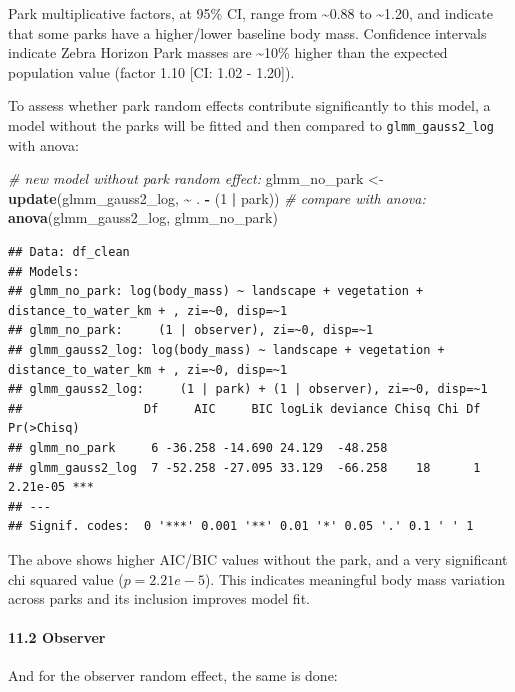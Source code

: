 \documentclass[
]{article}
\newenvironment{Shaded}{\begin{snugshade}}{\end{snugshade}}
\newcommand{\CommentTok}[1]{\textcolor[rgb]{0.56,0.35,0.01}{\textit{#1}}}
\newcommand{\DecValTok}[1]{\textcolor[rgb]{0.00,0.00,0.81}{#1}}
\newcommand{\FunctionTok}[1]{\textcolor[rgb]{0.13,0.29,0.53}{\textbf{#1}}}
\newcommand{\NormalTok}[1]{#1}
\newcommand{\OtherTok}[1]{\textcolor[rgb]{0.56,0.35,0.01}{#1}}
\newcommand{\SpecialCharTok}[1]{\textcolor[rgb]{0.81,0.36,0.00}{\textbf{#1}}}
\begin{document}
Park multiplicative factors, at 95\% CI, range from \textasciitilde0.88
to \textasciitilde1.20, and indicate that some parks have a higher/lower
baseline body mass. Confidence intervals indicate Zebra Horizon Park
masses are \textasciitilde10\% higher than the expected population value
(factor 1.10 {[}CI: 1.02 - 1.20{]}).

To assess whether park random effects contribute significantly to this
model, a model without the parks will be fitted and then compared to
\texttt{glmm\_gauss2\_log} with anova:

\begin{Shaded}
\begin{Highlighting}[]
\CommentTok{\# new model without park random effect:}
\NormalTok{glmm\_no\_park }\OtherTok{\textless{}{-}} \FunctionTok{update}\NormalTok{(glmm\_gauss2\_log, }\SpecialCharTok{\textasciitilde{}}\NormalTok{ . }\SpecialCharTok{{-}}\NormalTok{ (}\DecValTok{1} \SpecialCharTok{|}\NormalTok{ park))}
\CommentTok{\# compare with anova:}
\FunctionTok{anova}\NormalTok{(glmm\_gauss2\_log, glmm\_no\_park)}
\end{Highlighting}
\end{Shaded}

\begin{verbatim}
## Data: df_clean
## Models:
## glmm_no_park: log(body_mass) ~ landscape + vegetation + distance_to_water_km + , zi=~0, disp=~1
## glmm_no_park:     (1 | observer), zi=~0, disp=~1
## glmm_gauss2_log: log(body_mass) ~ landscape + vegetation + distance_to_water_km + , zi=~0, disp=~1
## glmm_gauss2_log:     (1 | park) + (1 | observer), zi=~0, disp=~1
##                 Df     AIC     BIC logLik deviance Chisq Chi Df Pr(>Chisq)    
## glmm_no_park     6 -36.258 -14.690 24.129  -48.258                            
## glmm_gauss2_log  7 -52.258 -27.095 33.129  -66.258    18      1   2.21e-05 ***
## ---
## Signif. codes:  0 '***' 0.001 '**' 0.01 '*' 0.05 '.' 0.1 ' ' 1
\end{verbatim}

The above shows higher AIC/BIC values without the park, and a very
significant chi squared value (\(p = 2.21e-5\)). This indicates
meaningful body mass variation across parks and its inclusion improves
model fit.

\paragraph{11.2 Observer}\label{observer}

And for the observer random effect, the same is done:
\end{document}
